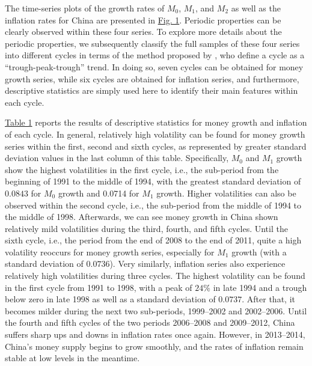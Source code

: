 \documentclass[a4paper,fleqn]{cas-sc}
\begin{document}
The time-series plots of the growth rates of $M_0$, $M_1$, and $M_2$ as well as the inflation rates for China are presented in \hyperref[fig:1]{Fig. 1}. Periodic properties can be clearly observed within these four series. To explore more details about the periodic properties, we subsequently classify the full samples of these four series into different cycles in terms of the method proposed by \cite*{artis1995}, who define a cycle as a “trough-peak-trough” trend. In doing so, seven cycles can be obtained for money growth series, while six cycles are obtained for inflation series, and furthermore, descriptive statistics are simply used here to identify their main features within each cycle.

\hyperref[tbl1]{Table 1} reports the results of descriptive statistics for money growth and inflation of each cycle. In general, relatively high volatility can be found for money growth series within the first, second and sixth cycles, as represented by greater standard deviation values in the last column of this table. Specifically, $M_0$ and $M_1$ growth show the highest volatilities in the first cycle, i.e., the sub-period from the beginning of 1991 to the middle of 1994, with the greatest standard deviation of $0.0843$ for $M_0$ growth and 0.0714 for $M_1$ growth. Higher volatilities can also be observed within the second cycle, i.e., the sub-period from the middle of 1994 to the middle of 1998. Afterwards, we can see money growth in China shown relatively mild volatilities during the third, fourth, and fifth cycles. Until the sixth cycle, i.e., the period from the end of 2008 to the end of 2011, quite a high volatility reoccurs for money growth series, especially for $M_1$ growth (with a standard deviation of $0.0736$). Very similarly, inflation series also experience relatively high volatilities during three cycles. The highest volatility can be found in the first cycle from 1991 to 1998, with a peak of $24\%$ in late 1994 and a trough below zero in late 1998 as well as a standard deviation of $0.0737$. After that, it becomes milder during the next two sub-periods, 1999–2002 and 2002–2006. Until the fourth and fifth cycles of the two periods 2006–2008 and 2009–2012, China suffers sharp ups and downs in inflation rates once again. However, in 2013–2014, China's money supply begins to grow smoothly, and the rates of inflation remain stable at low levels in the meantime.
\end{document}

